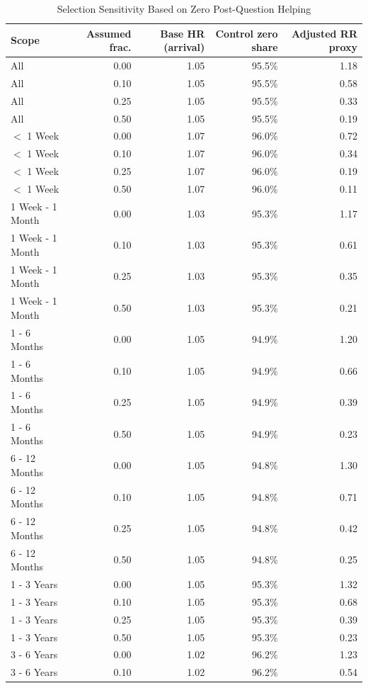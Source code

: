 \begin{table}[H]
\caption{Selection Sensitivity Based on Zero Post-Question Helping}
\label{tab:selection_bounds}
\centering
\footnotesize
\begin{tabular}{@{}lrrrr@{}}
\toprule
\textbf{Scope} & \textbf{Assumed frac.} & \textbf{Base HR (arrival)} & \textbf{Control zero share} & \textbf{Adjusted RR proxy} \\
\midrule
All & 0.00 & 1.05 & 95.5\% & 1.18 \\
All & 0.10 & 1.05 & 95.5\% & 0.58 \\
All & 0.25 & 1.05 & 95.5\% & 0.33 \\
All & 0.50 & 1.05 & 95.5\% & 0.19 \\
$<$ 1 Week & 0.00 & 1.07 & 96.0\% & 0.72 \\
$<$ 1 Week & 0.10 & 1.07 & 96.0\% & 0.34 \\
$<$ 1 Week & 0.25 & 1.07 & 96.0\% & 0.19 \\
$<$ 1 Week & 0.50 & 1.07 & 96.0\% & 0.11 \\
1 Week - 1 Month & 0.00 & 1.03 & 95.3\% & 1.17 \\
1 Week - 1 Month & 0.10 & 1.03 & 95.3\% & 0.61 \\
1 Week - 1 Month & 0.25 & 1.03 & 95.3\% & 0.35 \\
1 Week - 1 Month & 0.50 & 1.03 & 95.3\% & 0.21 \\
1 - 6 Months & 0.00 & 1.05 & 94.9\% & 1.20 \\
1 - 6 Months & 0.10 & 1.05 & 94.9\% & 0.66 \\
1 - 6 Months & 0.25 & 1.05 & 94.9\% & 0.39 \\
1 - 6 Months & 0.50 & 1.05 & 94.9\% & 0.23 \\
6 - 12 Months & 0.00 & 1.05 & 94.8\% & 1.30 \\
6 - 12 Months & 0.10 & 1.05 & 94.8\% & 0.71 \\
6 - 12 Months & 0.25 & 1.05 & 94.8\% & 0.42 \\
6 - 12 Months & 0.50 & 1.05 & 94.8\% & 0.25 \\
1 - 3 Years & 0.00 & 1.05 & 95.3\% & 1.32 \\
1 - 3 Years & 0.10 & 1.05 & 95.3\% & 0.68 \\
1 - 3 Years & 0.25 & 1.05 & 95.3\% & 0.39 \\
1 - 3 Years & 0.50 & 1.05 & 95.3\% & 0.23 \\
3 - 6 Years & 0.00 & 1.02 & 96.2\% & 1.23 \\
3 - 6 Years & 0.10 & 1.02 & 96.2\% & 0.54 \\

\end{tabular}
\end{table}
